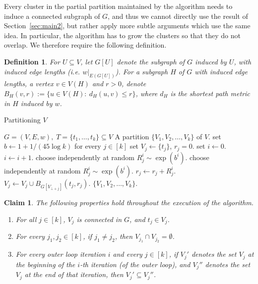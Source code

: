 \documentclass[twoside,leqno,twocolumn]{article}
\newtheorem{definition}[Definition]{Definition}
\newtheorem{claim}[lemma]{Claim}
\newtheorem{definition}[theorem]{Definition}
\newtheorem{claim}[theorem]{Claim}
\providecommand{\eqdef}{:=}
\def\compactify{\itemsep=0pt \topsep=0pt \partopsep=0pt \parsep=0pt}
\begin{document}
Every cluster in the partial partition maintained by the algorithm needs to induce a connected subgraph of $G$, 
and thus we cannot directly use the result of Section~\ref{sec:main2}, 
but rather apply more subtle arguments which use the same idea. 
In particular, the algorithm has to grow the clusters so that they do not overlap. We therefore require the following definition.
\begin{definition}
For $U \subseteq V$, let $G[U]$ denote the subgraph of $G$ induced by $U$, with induced edge lengths (i.e. $w|_{E(G[U])}$).
For a subgraph $H$ of $G$ with induced edge lengths, a vertex $v \in V(H)$ and $r>0$, denote $B_H(v,r) \eqdef \{u \in V(H):\ d_H(u,v) \le r\}$, where $d_H$ is the shortest path metric in $H$ induced by $w$.
\end{definition}

\begin{algorithm}[H]
\caption{Partitioning $V$}
\label{alg:part}
\begin{algorithmic}[1]
\REQUIRE $G = (V,E,w),\; T =\{t_1,\ldots,t_k\}\subseteq V$
\ENSURE A partition $\{V_1,V_2,\ldots,V_k\}$ of $V$.
\STATE set $b \leftarrow 1 + 1/(45\log k)$
\STATE for every $j \in [k]$ set $V_j \leftarrow \{t_j\}$, $r_j=0$.
\STATE set $i \leftarrow 0$. 
 \label{al:outer} 
\STATE $i \leftarrow i+1$.
 \label{al:inner}
\ifprocs
\STATE choose independently\! at\!  random\! $R_j^i \sim \exp(b^i)$.
\else
\STATE choose independently at  random $R_j^i \sim \exp(b^i)$.
\fi
\STATE $r_j \leftarrow r_j + R_j^i$.
\STATE $V_j \leftarrow V_j \cup B_{G[V_{\bot+j}]}(t_j,r_j)$. 
\ENDFOR
\ENDWHILE \label{al:endOuter}
\RETURN $\{V_1,V_2,\ldots,V_k\}$.
\end{algorithmic}
\end{algorithm}

\begin{claim}
The following properties hold throughout the execution of the algorithm.
\begin{enumerate} \compactify
	\item For all $j \in [k]$, $V_j$ is connected in $G$, and $t_j \in V_j$.
	\item For every $j_1,j_2 \in [k]$, if $j_1 \ne j_2$, then $V_{j_1} \cap V_{j_2} = \emptyset$.
	\item For every outer loop iteration $i$ and every $j \in [k]$, 
if $V_j'$ denotes the set $V_j$ at the beginning of the $i$-th iteration (of the outer loop), and $V_j''$ denotes the set $V_j$ at the end of that iteration, 
then $V_j' \subseteq V_j''$.
\end{enumerate}
\end{claim}
\end{document}
